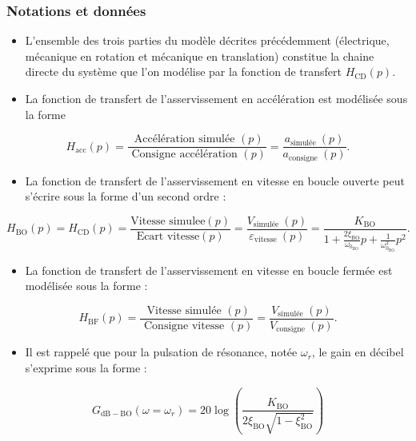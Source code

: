 \subsubsection*{Notations et données}
\begin{itemize}
  \item L'ensemble des trois parties du modèle décrites précédemment (électrique, mécanique en rotation et mécanique en translation) constitue la chaine directe du système que l'on modélise par la fonction de transfert $H_{\mathrm{CD}}(p)$.
  \item La fonction de transfert de l'asservissement en accélération est modélisée sous la forme
\end{itemize}

$$
H_{\mathrm{acc}}(p)=\frac{\text { Accélération simulée }(p)}{\text { Consigne accélération }(p)}=\frac{a_{\text {simulée }}(p)}{a_{\text {consigne }}(p)} .
$$

\begin{itemize}
  \item La fonction de transfert de l'asservissement en vitesse en boucle ouverte peut s'écrire sous la forme d'un second ordre :
\end{itemize}

$$
H_{\mathrm{BO}}(p)=H_{\mathrm{CD}}(p)=\frac{\text{Vitesse simulee}(p)}{\text{Ecart vitesse}(p)}=\frac{V_{\text {simulée }}(p)}{\varepsilon_{\text {vitesse }}(p)}=\frac{K_{\mathrm{BO}}}{1+\frac{2 \xi_{\mathrm{BO}}}{\omega_{0_{\mathrm{BO}}}} p+\frac{1}{\omega_{0_{\mathrm{BO}}}^{2}} p^{2}} .
$$

\begin{itemize}
  \item La fonction de transfert de l'asservissement en vitesse en boucle fermée est modélisée sous la forme :
\end{itemize}

$$
H_{\mathrm{BF}}(p)=\frac{\text { Vitesse simulée }(p)}{\text { Consigne vitesse }(p)}=\frac{V_{\text {simulée }}(p)}{V_{\text {consigne }}(p)} .
$$

\begin{itemize}
  \item Il est rappelé que pour la pulsation de résonance, notée $\omega_{r}$, le gain en décibel s'exprime sous la forme :
\end{itemize}

$$
G_{\mathrm{dB}-\mathrm{BO}}\left(\omega=\omega_{r}\right)=20 \log \left(\frac{K_{\mathrm{BO}}}{2 \xi_{\mathrm{BO}} \sqrt{1-\xi_{\mathrm{BO}}^{2}}}\right)
$$

